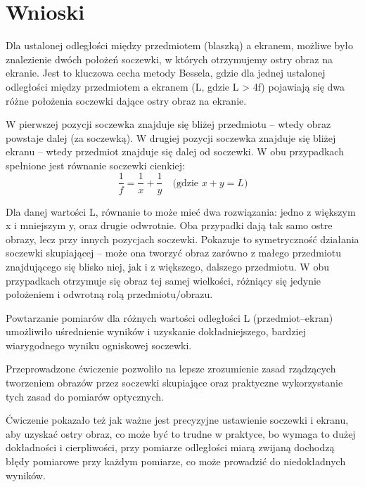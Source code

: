 \documentclass[12pt]{article}
\begin{document}
\normalfont

\section*{Wnioski}
Dla ustalonej odległości między przedmiotem (blaszką) a ekranem, możliwe było znalezienie dwóch położeń 
soczewki, w których otrzymujemy ostry obraz na ekranie. Jest to kluczowa cecha metody Bessela, gdzie 
dla jednej ustalonej odległości między przedmiotem a ekranem (L, gdzie L > 4f) pojawiają się dwa różne 
położenia soczewki dające ostry obraz na ekranie.

W pierwszej pozycji soczewka znajduje się bliżej przedmiotu -- wtedy obraz powstaje dalej (za soczewką). 
W drugiej pozycji soczewka znajduje się bliżej ekranu -- wtedy przedmiot znajduje się dalej od soczewki. 
W obu przypadkach spełnione jest równanie soczewki cienkiej:
\[
    \frac{1}{f} = \frac{1}{x} + \frac{1}{y} \quad \text{(gdzie } x + y = L\text{)}
\]

Dla danej wartości L, równanie to może mieć dwa rozwiązania: jedno z większym x i mniejszym y, 
oraz drugie odwrotnie. Oba przypadki dają tak samo ostre obrazy, lecz przy innych pozycjach soczewki. 
Pokazuje to symetryczność działania soczewki skupiającej -- może ona tworzyć obraz zarówno z małego 
przedmiotu znajdującego się blisko niej, jak i z większego, dalszego przedmiotu. W obu przypadkach 
otrzymuje się obraz tej samej wielkości, różniący się jedynie położeniem i odwrotną rolą przedmiotu/obrazu.

Powtarzanie pomiarów dla różnych wartości odległości L (przedmiot--ekran) umożliwiło uśrednienie wyników 
i uzyskanie dokładniejszego, bardziej wiarygodnego wyniku ogniskowej soczewki.

Przeprowadzone ćwiczenie pozwoliło na lepsze zrozumienie zasad rządzących tworzeniem obrazów przez 
soczewki skupiające oraz praktyczne wykorzystanie tych zasad do pomiarów optycznych.

Ćwiczenie pokazało też jak ważne jest precyzyjne ustawienie soczewki i ekranu, aby uzyskać ostry obraz,
co może być to trudne w praktyce, bo wymaga to dużej dokładności i cierpliwości, przy pomiarze odległości
miarą zwijaną dochodzą błędy pomiarowe przy każdym pomiarze, co może prowadzić do niedokładnych wyników.
\end{document}
